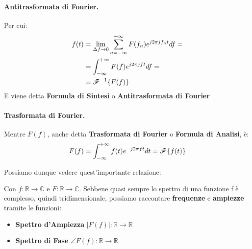\paragraph{Antitrasformata di Fourier.}Per cui:
\begin{align*}
    f(t) &= \lim_{\Delta f \to 0} \sum_{n = -\infty}^{+\infty} F(f_n) e^{j2 \pi j f_n t} df =\\
         &= \int_{-\infty}^{+\infty} F(f) e^{j2 \pi j f t} df =\\
         &= {\mathscr{F}}^{-1}\{F(f)\}
\end{align*}
E viene detta \textbf{Formula di Sintesi} o \textbf{Antitrasformata di Fourier}
\paragraph{Trasformata di Fourier.}Mentre $F(f)$, anche detta \textbf{Trasformata di Fourier} o \textbf{Formula di Analisi}, è:
\begin{equation}
    F(f) = \int_{-\infty}^{+\infty} f(t) e^{-j2 \pi f t} dt = {\mathscr{F}}\{f(t)\}
\end{equation}


\begin{minipage}{\textwidth}
    Possiamo dunque vedere quest'importante relazione:\\
\begin{center}
    \end{center}
    Con $f : \mathbb{R} \rightarrow \mathbb{C}$ e $F : \mathbb{R} \rightarrow \mathbb{C}$. Sebbene quasi sempre lo spettro di una
funzione f è complesso, quindi tridimensionale, possiamo raccontare \textbf{frequenze} e \textbf{ampiezze} tramite le funzioni:
\begin{itemize}
    \item \textbf{Spettro d'Ampiezza} $|F(f)| : \mathbb{R} \rightarrow \mathbb{R}$
    \item \textbf{Spettro di Fase} $\angle F(f) : \mathbb{R} \rightarrow \mathbb{R}$
\end{itemize} 

\end{minipage}

